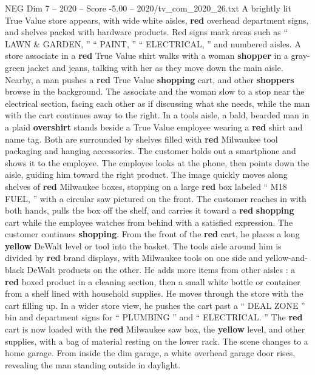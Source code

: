 \begin{textsample}{NEG Dim 7 – 2020 – Score -5.00 – 2020/tv\_com\_2020\_26.txt}  \label{ex:f7_neg_006}
A brightly lit True Value store appears, with wide white aisles, \textbf{red} overhead department signs, and shelves packed with hardware products.
Red signs mark areas such as “ LAWN \& GARDEN, ” “ PAINT, ” “ ELECTRICAL, ” and numbered aisles.
A store associate in a \textbf{red} True Value shirt walks with a woman \textbf{shopper} in a gray-green jacket and jeans, talking with her as they move down the main aisle.
Nearby, a man pushes a \textbf{red} True Value \textbf{shopping} cart, and other \textbf{shoppers} browse in the background.
The associate and the woman slow to a stop near the electrical section, facing each other as if discussing what she needs, while the man with the cart continues away to the right.
In a tools aisle, a bald, bearded man in a plaid \textbf{overshirt} stands beside a True Value employee wearing a \textbf{red} shirt and name tag.
Both are surrounded by shelves filled with \textbf{red} Milwaukee tool packaging and hanging accessories.
The customer holds out a smartphone and shows it to the employee.
The employee looks at the phone, then points down the aisle, guiding him toward the right product.
The image quickly moves along shelves of \textbf{red} Milwaukee boxes, stopping on a large \textbf{red} box labeled “ M18 FUEL, ” with a circular saw pictured on the front.
The customer reaches in with both hands, pulls the box off the shelf, and carries it toward a \textbf{red} \textbf{shopping} cart while the employee watches from behind with a satisfied expression.
The customer continues \textbf{shopping}.
From the front of the \textbf{red} cart, he places a long \textbf{yellow} DeWalt level or tool into the basket.
The tools aisle around him is divided by \textbf{red} brand displays, with Milwaukee tools on one side and yellow-and-black DeWalt products on the other.
He adds more items from other aisles : a \textbf{red} boxed product in a cleaning section, then a small white bottle or container from a shelf lined with household supplies.
He moves through the store with the cart filling up.
In a wider store view, he pushes the cart past a “ DEAL ZONE ” bin and department signs for “ PLUMBING ” and “ ELECTRICAL. ” The \textbf{red} cart is now loaded with the \textbf{red} Milwaukee saw box, the \textbf{yellow} level, and other supplies, with a bag of material resting on the lower rack.
The scene changes to a home garage.
From inside the dim garage, a white overhead garage door rises, revealing the man standing outside in daylight.

\end{textsample}
